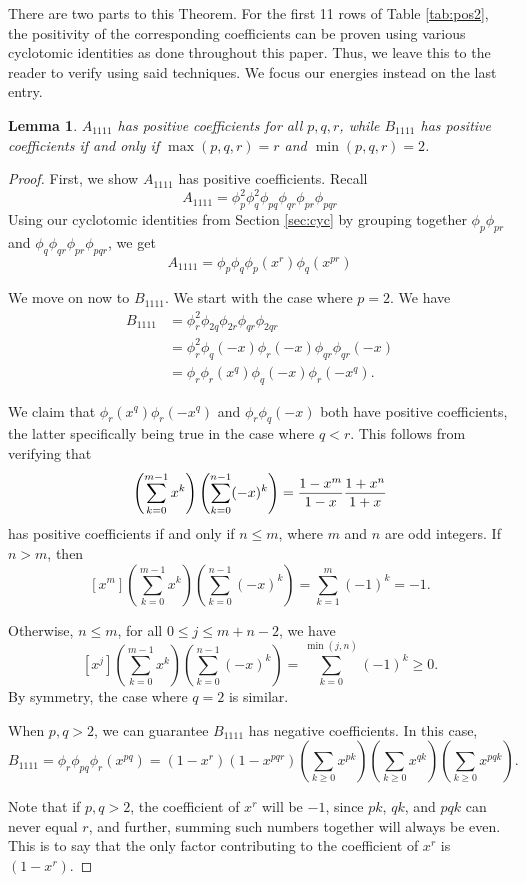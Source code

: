 \documentclass[11pt]{amsart}
\numberwithin{equation}{section}
\theoremstyle{plain}
\newtheorem{lemma}[equation]{Lemma}
\theoremstyle{definition}
\begin{document}
There are two parts to this Theorem. For the first 11 rows of Table \ref{tab:pos2}, the positivity of the corresponding coefficients can be proven using various cyclotomic identities as done throughout this paper. Thus, we leave this to the reader to verify using said techniques.
We focus our energies instead on the last entry. 


\begin{lemma}\label{lem:pqr}
$A_{1111}$ has positive coefficients for all $p,q,r$, while  $B_{1111}$ has positive coefficients if and only if $\max(p,q,r)=r$ and $\min(p,q,r)=2$.
\end{lemma}
\begin{proof}
First, we show $A_{1111}$ has positive coefficients. Recall
\[A_{1111}=\phi_p^2\phi_q^2\phi_{pq}\phi_{qr}\phi_{pr}\phi_{pqr}\]
Using our cyclotomic identities from Section \ref{sec:cyc} by grouping together $\phi_p\phi_{pr}$ and $\phi_q\phi_{qr}\phi_{pr} \phi_{pqr}$, we get 
\[A_{1111}=\phi_p\phi_q\phi_p(x^r)\phi_q(x^{pr})\]


We move on now to $B_{1111}$. We start with the case where $p=2$. We have
\begin{align*}
B_{1111}&=\phi_r^2\phi_{2q}\phi_{2r}\phi_{qr}\phi_{2qr}\\
&=\phi_r^2\phi_q(-x)\phi_r(-x)\phi_{qr}\phi_{qr}(-x)\\
&=\phi_r\phi_r(x^q)\phi_q(-x)\phi_{r}(-x^q).
\end{align*}

We claim that $\phi_r(x^q)\phi_r(-x^q)$ and $\phi_r\phi_q(-x)$ both have positive coefficients, the latter specifically being true in the case where $q<r$. 
This follows from verifying that
\[ \left(\sum_{k=0}^{m-1} x^k\right)\left(\sum_{k=0}^{n-1} (-x)^k\right)={1-x^m\over 1-x}{1+x^n\over 1+x}\]
has positive coefficients if and only if $n\leq m$, where $m$ and $n$ are odd integers.
If $n>m$, then
\[ [x^{m}] \left(\sum_{k=0}^{m-1} x^k\right)\left(\sum_{k=0}^{n-1} (-x)^k\right)=\sum_{k=1}^{m} (-1)^{k}=-1.\]

Otherwise, $n\leq m$, for all $0\leq j\leq m+n-2$, we have
\[ [x^j] \left(\sum_{k=0}^{m-1} x^k\right)\left(\sum_{k=0}^{n-1} (-x)^k\right)=\sum_{k=0}^{\min(j,n)} (-1)^k\geq 0.\]
By symmetry, the case where $q=2$ is similar.

When $p,q>2$, we can guarantee $B_{1111}$ has negative coefficients. In this case, 
\[B_{1111}=\phi_r\phi_{pq}\phi_r(x^{pq})=(1-x^r)(1-x^{pqr})\left(\sum_{k\geq 0} x^{pk} \right)\left(\sum_{k\geq 0} x^{qk} \right)\left(\sum_{k\geq 0} x^{pqk} \right).\]

Note that if $p,q>2$, the coefficient of $x^r$ will be $-1$, since $pk$, $qk$, and $pqk$ can never equal $r$, and further, summing such numbers together will always be even. This is to say that the only factor contributing to the coefficient of $x^r$ is $(1-x^r)$.
\end{proof}
\end{document}
